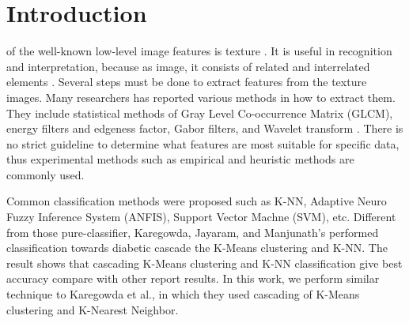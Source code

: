 \documentclass[conference]{IEEEtran}
\begin{document}
%
\IEEEpeerreviewmaketitle
\section{Introduction}
% 
% 
% 
% 
 of the well-known low-level image features is texture \cite{Avci2015}. It is useful in recognition and interpretation, because as image, it consists of related and interrelated elements \cite{Chandankhede2012}. Several steps must be done to extract features from the texture images. Many researchers has reported various methods in how to extract them. They include statistical methods of Gray Level Co-occurrence Matrix (GLCM), energy filters and edgeness factor, Gabor filters, and Wavelet transform \cite{Ruiz2004,Mohanaiah2013}. There is no strict guideline to determine what features are most suitable for specific data, thus experimental methods such as empirical and heuristic methods are commonly used.\par

Common classification methods were proposed such as K-NN, Adaptive Neuro Fuzzy Inference System (ANFIS), Support Vector Machne (SVM), etc. Different from those pure-classifier, Karegowda, Jayaram, and Manjunath's \cite{Karegowda2012} performed classification towards diabetic cascade the K-Means clustering and K-NN. The result shows that cascading K-Means clustering and K-NN classification give best accuracy compare with other report results. In this work, we perform similar technique to Karegowda et al., in which they used cascading of K-Means clustering and K-Nearest Neighbor. 
\end{document}
